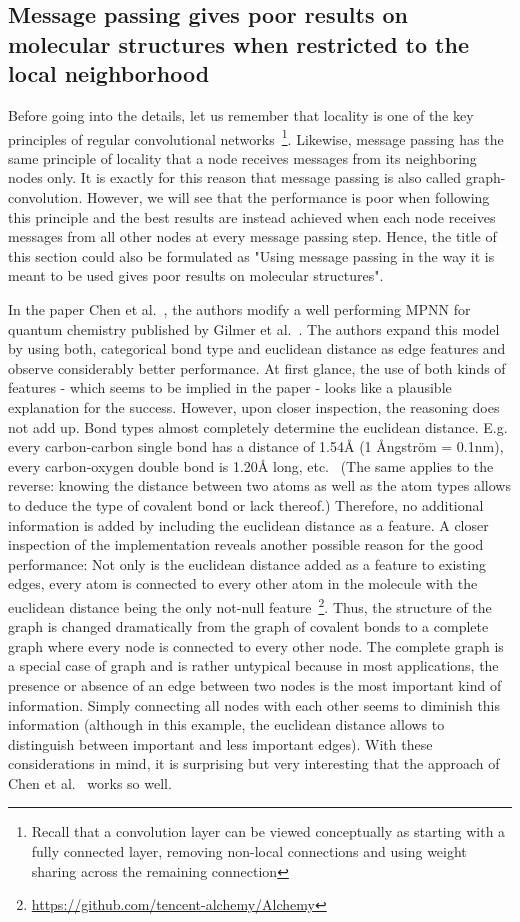 \subsection{Message passing gives poor results on molecular structures when restricted to the local neighborhood}
\label{sec:neighborhood-expansion}

Before going into the details, let us remember that locality is one of the key principles of regular convolutional networks~\footnote{
	Recall that a convolution layer can be viewed conceptually as starting with a fully connected layer, removing non-local connections and using weight sharing across the remaining connection
}. Likewise, message passing has the same principle of locality that a node receives messages from its neighboring nodes only. It is exactly for this reason that message passing is also called graph-convolution. However, we will see that the performance is poor when following this principle and the best results are instead achieved when each node receives messages from all other nodes at every message passing step. Hence, the title of this section could also be formulated as "Using message passing in the way it is meant to be used gives poor results on molecular structures".


In the paper Chen et al.~\cite{Chen2019}, the authors modify a well performing MPNN for quantum chemistry published by Gilmer et al.~\cite{Gilmer2017}. The authors expand this model by using both, categorical bond type and euclidean distance as edge features and observe considerably better performance. At first glance, the use of both kinds of features - which seems to be implied in the paper - looks like a plausible explanation for the success. However, upon closer inspection, the reasoning does not add up. Bond types almost completely determine the euclidean distance. E.g. every carbon-carbon single bond has a distance of 1.54Å (1 Ångström = 0.1nm), every carbon-oxygen double bond is 1.20Å long, etc.~\cite{Organic-chemistry} (The same applies to the reverse: knowing the distance between two atoms as well as the atom types allows to deduce the type of covalent bond or lack thereof.) Therefore, no additional information is added by including the euclidean distance as a feature. A closer inspection of the implementation reveals another possible reason for the good performance: Not only is the euclidean distance added as a feature to existing edges, every atom is connected to every other atom in the molecule with the euclidean distance being the only not-null feature~\footnote{\url{https://github.com/tencent-alchemy/Alchemy}}. Thus, the structure of the graph is changed dramatically from the graph of covalent bonds to a complete graph where every node is connected to every other node. The complete graph is a special case of graph and is rather untypical because in most applications, the presence or absence of an edge between two nodes is the most important kind of information. Simply connecting all nodes with each other seems to diminish this information (although in this example, the euclidean distance allows to distinguish between important and less important edges). With these considerations in mind, it is surprising but very interesting that the approach of Chen et al.~\cite{Chen2019} works so well.

